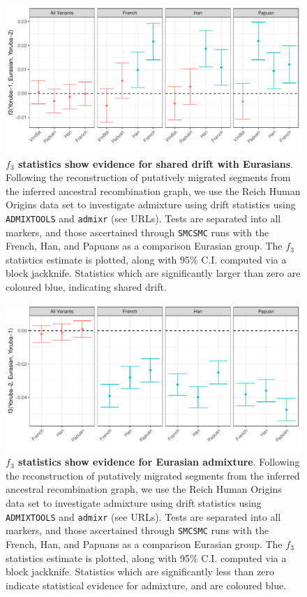 \begin{figure}
  \centering
  \includegraphics[width = \textwidth]{plot/f3.pdf}
  \caption{ {\bf $f_3$ statistics show evidence for shared drift with Eurasians}. Following the reconstruction of putatively migrated segments from the inferred ancestral recombination graph, we use the Reich Human Origins data set to investigate admixture using drift statistics using {\tt ADMIXTOOLS} and {\tt admixr} (see URLs). Tests are separated into all markers, and those ascertained through {\tt SMCSMC} runs with the French, Han, and Papuans as a comparison Eurasian group. The $f_3$ statistics estimate is plotted, along with 95\% C.I. computed via a block jackknife. Statistics which are significantly larger than zero are coloured blue, indicating shared drift.}
  \label{fig:f3}
\end{figure}


\begin{figure}
  \centering
  \includegraphics[width=\textwidth]{plot/f3_admix.pdf}
  \caption{{\bf $f_3$ statistics show evidence for Eurasian admixture}. Following the reconstruction of putatively migrated segments from the inferred ancestral recombination graph, we use the Reich Human Origins data set to investigate admixture using drift statistics using {\tt ADMIXTOOLS} and {\tt admixr} (see URLs). Tests are separated into all markers, and those ascertained through {\tt SMCSMC} runs with the French, Han, and Papuans as a comparison Eurasian group. The $f_3$ statistics estimate is plotted, along with 95\% C.I. computed via a block jackknife. Statistics which are significantly less than zero indicate statistical evidence for admixture, and are coloured blue.}
  \label{fig:f3_admix}
\end{figure}

